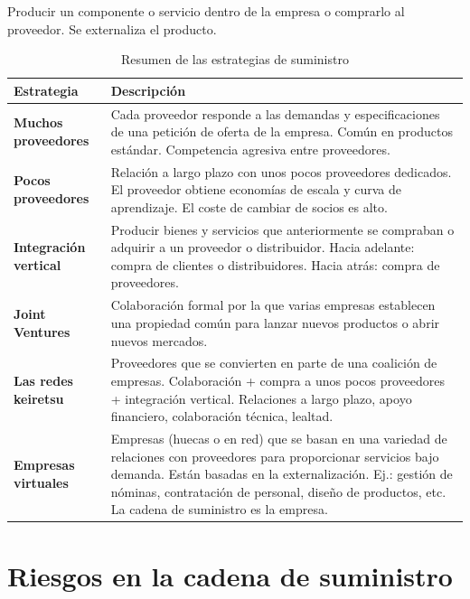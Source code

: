 \documentclass[12pt]{book} %
\begin{document}
\begin{definicion}
Producir un componente o servicio dentro de la empresa o comprarlo al proveedor. Se externaliza el producto.
\end{definicion}

\begin{table}[H]
\centering
\caption{Resumen de las estrategias de suministro}
\begin{tabular}{|p{4cm}|p{12cm}|}
\hline
\textbf{Estrategia} & \textbf{Descripción} \\ \hline
\textbf{Muchos proveedores} & Cada proveedor responde a las demandas y especificaciones de una petición de oferta de la empresa. Común en productos estándar. Competencia agresiva entre proveedores. \\ \hline
\textbf{Pocos proveedores} & Relación a largo plazo con unos pocos proveedores dedicados. El proveedor obtiene economías de escala y curva de aprendizaje. El coste de cambiar de socios es alto. \\ \hline
\textbf{Integración vertical} & Producir bienes y servicios que anteriormente se compraban o adquirir a un proveedor o distribuidor. Hacia adelante: compra de clientes o distribuidores. Hacia atrás: compra de proveedores. \\ \hline
\textbf{Joint Ventures} & Colaboración formal por la que varias empresas establecen una propiedad común para lanzar nuevos productos o abrir nuevos mercados. \\ \hline
\textbf{Las redes keiretsu} & Proveedores que se convierten en parte de una coalición de empresas. Colaboración + compra a unos pocos proveedores + integración vertical. Relaciones a largo plazo, apoyo financiero, colaboración técnica, lealtad. \\ \hline
\textbf{Empresas virtuales} & Empresas (huecas o en red) que se basan en una variedad de relaciones con proveedores para proporcionar servicios bajo demanda. Están basadas en la externalización. Ej.: gestión de nóminas, contratación de personal, diseño de productos, etc. La cadena de suministro es la empresa. \\ \hline
\end{tabular}
\end{table}

\hypertarget{riesgos-en-la-cadena-de-suministro}{%
\section{Riesgos en la cadena de
suministro}\label{riesgos-en-la-cadena-de-suministro}}
\end{document}
